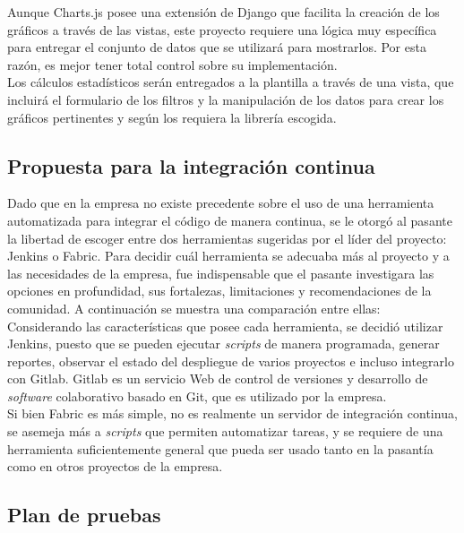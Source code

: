Aunque Charts.js posee una extensión de Django que facilita la creación de los gráficos a través de las vistas, este proyecto requiere una lógica muy específica para entregar el conjunto de datos que se utilizará para mostrarlos. Por esta razón, es mejor tener total control sobre su implementación. \\

Los cálculos estadísticos serán entregados a la plantilla a través de una vista, que incluirá el formulario de los filtros y la manipulación de los datos para crear los gráficos pertinentes y según los requiera la librería escogida.

\subsection{Propuesta para la integración continua}

Dado que en la empresa no existe precedente sobre el uso de una herramienta automatizada para integrar el código de manera continua, se le otorgó al pasante la libertad de escoger entre dos herramientas sugeridas por el líder del proyecto: Jenkins o Fabric. Para decidir cuál herramienta se adecuaba más al proyecto y a las necesidades de la empresa, fue indispensable que el pasante investigara las opciones en profundidad, sus fortalezas, limitaciones y recomendaciones de la comunidad. A continuación se muestra una comparación entre ellas: \\



Considerando las características que posee cada herramienta, se decidió
utilizar Jenkins, puesto que se pueden ejecutar \textit{scripts} de manera
programada, generar reportes, observar el estado del despliegue de varios
proyectos e incluso integrarlo con Gitlab. Gitlab es un servicio Web de control de versiones y desarrollo de \textit{software} colaborativo basado en Git, que es utilizado por la empresa.\\

Si bien Fabric es más simple, no es realmente un servidor de integración continua, se asemeja más a \textit{scripts} que permiten automatizar tareas, y se requiere de una herramienta suficientemente general que pueda ser usado tanto en la pasantía como en otros proyectos de la empresa.

\subsection{Plan de pruebas}

